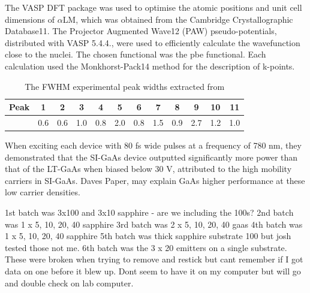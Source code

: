 The VASP DFT package was used to optimise the atomic positions and unit cell dimensions of $\alpha$LM, which was obtained from the Cambridge Crystallographic Database11. The Projector Augmented Wave12 (PAW) pseudo-potentials, distributed with VASP 5.4.4., were used to efficiently calculate the wavefunction close to the nuclei. The chosen functional was the \acrshort{pbe} functional. Each calculation used the Monkhorst-Pack14 method for the description of k-points.

\begin{table}[h]
\centering
\begin{tabular}{@{}cccccccccccc@{}}
\toprule
Peak & 1 & 2 & 3 & 4 & 5 & 6 & 7 & 8 & 9 & 10 & 11 \\ \midrule
    & 0.6 & 0.6 & 1.0 & 0.8 & 2.0 & 0.8 & 1.5 & 0.9 & 2.7 & 1.2 & 1.0 \\ \bottomrule
\end{tabular}
\caption{The FWHM experimental peak widths extracted from }
\label{tab:fwhm}
\end{table}

When exciting each device with 80 fs wide pulses at a frequency of 780 nm, they demonstrated that the SI-GaAs device outputted significantly more power than that of the LT-GaAs when biased below 30 V, attributed to the high mobility carriers in SI-GaAs. Daves Paper, may explain GaAs higher performance at these low carrier densities.


1st batch was 3x100 and 3x10 sapphire - are we including the 100s?
2nd batch was 1 x 5, 10, 20, 40 sapphire 
3rd batch was 2 x 5, 10, 20, 40 gaas
4th batch was 1 x 5, 10, 20, 40 sapphire
5th batch was thick sapphire substrate 100 but josh tested those not me.
6th batch was the 3 x 20 emitters on a single substrate. These were broken when trying to remove and restick but cant remember if I got data on one before it blew up. Dont seem to have it on my computer but will go and double check on lab computer.


